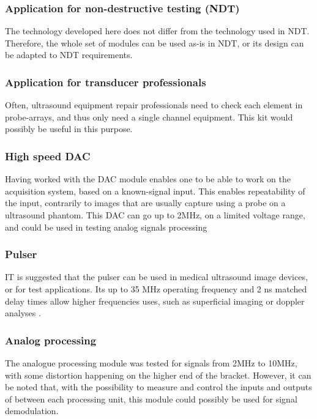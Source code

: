 \documentclass[letterpaper, 10 pt, conference]{ieeeconf} %
\begin{document}
\subsubsection{Application for non-destructive testing (NDT)} 

The technology developed here does not differ from the technology used in NDT. Therefore, the whole set of modules can be used as-is in NDT, or its design can be adapted to NDT requirements.

\subsubsection{Application for transducer professionals} 

Often, ultrasound equipment repair professionals need to check each element in probe-arrays, and thus only need a single channel equipment. This kit would possibly be useful in this purpose. 

\subsubsection{High speed DAC}

Having worked with the DAC module enables one to be able to work on the acquisition system, based on a known-signal input. This enables repeatability of the input, contrarily to images that are usually capture using a probe on a ultrasound phantom. This DAC can go up to 2MHz, on a limited voltage range, and could be used in testing analog signals processing

\subsubsection{Pulser}

IT is suggested that the pulser can be used in medical ultrasound image devices, or for test applications. Its up to 35 MHz operating frequency and 2 ns matched delay times allow higher frequencies uses, such as superficial imaging or doppler analyses \cite{c1}.

\subsubsection{Analog processing}

The analogue processing module was tested for signals from 2MHz to 10MHz, with some distortion happening on the higher end of the bracket. However, it can be noted that, with the possibility to measure and control the inputs and outputs of between each processing unit, this module could possibly be used for signal demodulation.
\end{document}
